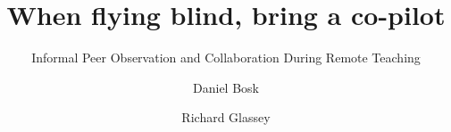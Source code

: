 \documentclass[sigconf]{acmart}
\begin{document}
\title{When flying blind, bring a co-pilot}
\subtitle{Informal Peer Observation and Collaboration During Remote Teaching}


\author{Daniel Bosk}
\orcid{}

\author{Richard Glassey}
\orcid{}


\begin{abstract}

\end{abstract}



\begin{CCSXML}

\end{CCSXML}


\keywords{}

\maketitle
\end{document}
